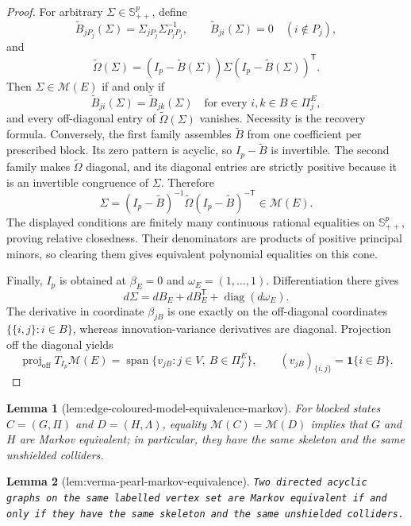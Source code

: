 \documentclass{article}
\newtheorem{lemma}{Lemma}
\begin{document}
\begin{proof}
For arbitrary \(\Sigma\in\mathbb S^p_{++}\), define
\[
 \widetilde B_{jP_j}(\Sigma)=\Sigma_{jP_j}\Sigma_{P_jP_j}^{-1},
 \qquad
 \widetilde B_{ji}(\Sigma)=0\quad(i\notin P_j),
\]
and
\[
 \widetilde\Omega(\Sigma)
 =(I_p-\widetilde B(\Sigma))\Sigma(I_p-\widetilde B(\Sigma))^{\mathsf T}.
\]
Then \(\Sigma\in\mathcal M(E)\) if and only if
\[
 \widetilde B_{ji}(\Sigma)=\widetilde B_{jk}(\Sigma)
 \quad\text{for every }i,k\in B\in\Pi^E_j,
\]
and every off-diagonal entry of \(\widetilde\Omega(\Sigma)\) vanishes. Necessity is the recovery formula. Conversely, the first family assembles \(\widetilde B\) from one coefficient per prescribed block. Its zero pattern is acyclic, so \(I_p-\widetilde B\) is invertible. The second family makes \(\widetilde\Omega\) diagonal, and its diagonal entries are strictly positive because it is an invertible congruence of \(\Sigma\). Therefore
\[
 \Sigma=(I_p-\widetilde B)^{-1}\widetilde\Omega(I_p-\widetilde B)^{-\mathsf T}\in\mathcal M(E).
\]
The displayed conditions are finitely many continuous rational equalities on \(\mathbb S^p_{++}\), proving relative closedness. Their denominators are products of positive principal minors, so clearing them gives equivalent polynomial equalities on this cone.

Finally, \(I_p\) is obtained at \(\beta_E=0\) and \(\omega_E=(1,\ldots,1)\). Differentiation there gives
\[
 d\Sigma=dB_E+dB_E^{\mathsf T}+\operatorname{diag}(d\omega_E).
\]
The derivative in coordinate \(\beta_{jB}\) is one exactly on the off-diagonal coordinates \(\{\{i,j\}:i\in B\}\), whereas innovation-variance derivatives are diagonal. Projection off the diagonal yields
\[
 \operatorname{proj}_{\mathrm{off}}T_{I_p}\mathcal M(E)
 =\operatorname{span}\{v_{jB}:j\in V,\ B\in\Pi^E_j\},
 \qquad
 (v_{jB})_{\{i,j\}}=\mathbf 1\{i\in B\}.
\]
\end{proof}

\begin{lemma}[lem:edge-coloured-model-equivalence-markov]\label{lem:edge-coloured-model-equivalence-markov}
For blocked states \(C=(G,\Pi)\) and \(D=(H,\Lambda)\), equality \(\mathcal M(C)=\mathcal M(D)\) implies that \(G\) and \(H\) are Markov equivalent; in particular, they have the same skeleton and the same unshielded colliders.
\end{lemma}

\begin{lemma}[lem:verma-pearl-markov-equivalence]\label{lem:verma-pearl-markov-equivalence}
\texttt{Two directed acyclic graphs on the same labelled vertex set are Markov equivalent if and only if they have the same skeleton and the same unshielded colliders.}
\end{lemma}
\end{document}
